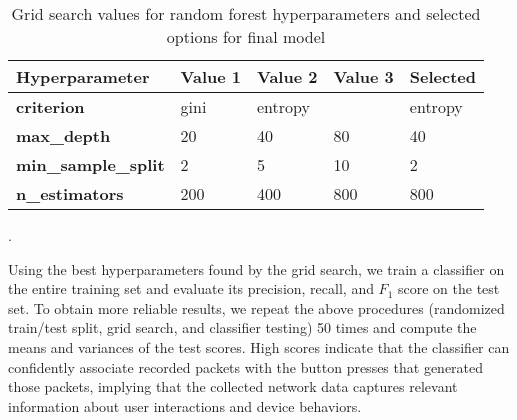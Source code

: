 \begin{table}[t]
\centering\footnotesize
\begin{tabular}{lllll}
\toprule
\textbf{Hyperparameter}          & \textbf{Value 1}  & \textbf{Value 2}   &\textbf{ Value 3}  & \textbf{Selected}       \\ \midrule
\textbf{criterion}          & gini  & entropy   & & entropy        \\
\textbf{max\_depth}         & 20     & 40          & 80  & 40      \\ 
\textbf{min\_sample\_split} & 2      & 5           & 10  & 2      \\ 
\textbf{n\_estimators}      & 200    & 400         & 800 & 800      \\ \bottomrule
\end{tabular}
\caption{Grid search values for random forest hyperparameters and selected options for final model}.
\label{tab:grid_parm}
\end{table}                                                                         

Using the best hyperparameters found by the grid search, we train a classifier on the entire training set and evaluate its precision, recall, and $F_1$ score on the test set. 
To obtain more reliable results, we repeat the above procedures (randomized train/test split, grid search, and classifier testing) 50 times and compute the means and variances of the test scores.
High scores indicate that the classifier can confidently associate recorded packets with the button presses that generated those packets,
implying that the collected network data captures relevant information about user interactions and device behaviors. 